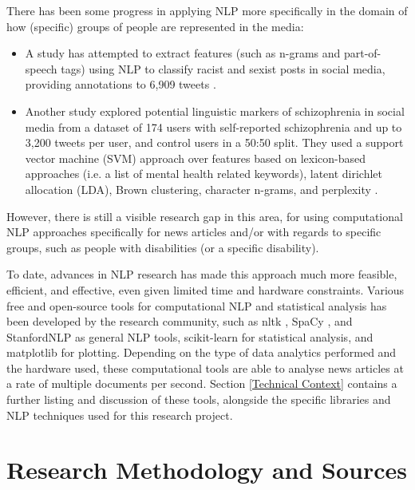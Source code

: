 \documentclass{report}
\begin{document}
There has been some progress in applying NLP more specifically in the domain of how (specific) groups of people are represented in the media:
\begin{itemize}
	\item A study has attempted to extract features (such as n-grams and part-of-speech tags) using NLP to classify racist and sexist posts in social media, providing annotations to 6,909 tweets \cite{waseem2016you}.
	\item Another study explored potential linguistic markers of schizophrenia in social media from a dataset of 174 users with self-reported schizophrenia and up to 3,200 tweets per user, and control users in a 50:50 split.
		They used a support vector machine (SVM) approach over features based on lexicon-based approaches (i.e. a list of mental health related keywords), latent dirichlet allocation (LDA), Brown clustering, character n-grams, and perplexity \cite{mitchell2015quantifying}.
\end{itemize}
However, there is still a visible research gap in this area, for using computational NLP approaches specifically for news articles and/or with regards to specific groups, such as people with disabilities (or a specific disability).

To date, advances in NLP research has made this approach much more feasible, efficient, and effective, even given limited time and hardware constraints.
Various free and open-source tools for computational NLP and statistical analysis has been developed by the research community, such as nltk \cite{Nltk}, SpaCy \cite{SpaCy}, and StanfordNLP \cite{StanfordNLP} as general NLP tools, scikit-learn \cite{Scikit-learn} for statistical analysis, and matplotlib \cite{Matplotlib} for plotting.
Depending on the type of data analytics performed and the hardware used, these computational tools are able to analyse news articles at a rate of multiple documents per second.
Section \ref{Technical Context} contains a further listing and discussion of these tools, alongside the specific libraries and NLP techniques used for this research project.

\section{Research Methodology and Sources} \label{Research Methodology and Sources}  %
\end{document}
